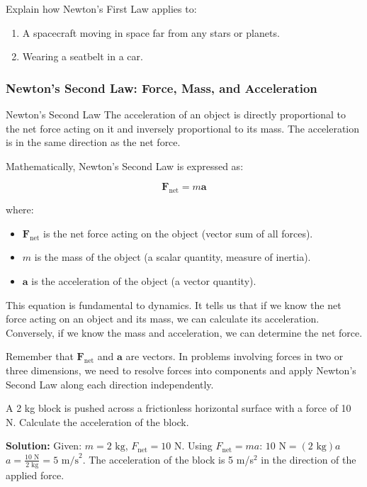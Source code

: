 \begin{stopandthink}
Explain how Newton's First Law applies to:
\begin{enumerate}
    \item A spacecraft moving in space far from any stars or planets.
    \item Wearing a seatbelt in a car.
\end{enumerate}
\end{stopandthink}

\subsubsection{Newton's Second Law: Force, Mass, and Acceleration}

\begin{keyconcept}{Newton's Second Law}
The acceleration of an object is directly proportional to the net force acting on it and inversely proportional to its mass. The acceleration is in the same direction as the net force.
\end{keyconcept}

Mathematically, Newton's Second Law is expressed as:

\[ \mathbf{F}_\text{net} = m\mathbf{a} \]

where:
\begin{itemize}
    \item $\mathbf{F}_\text{net}$ is the net force acting on the object (vector sum of all forces).
    \item $m$ is the mass of the object (a scalar quantity, measure of inertia).
    \item $\mathbf{a}$ is the acceleration of the object (a vector quantity).
\end{itemize}

This equation is fundamental to dynamics. It tells us that if we know the net force acting on an object and its mass, we can calculate its acceleration.  Conversely, if we know the mass and acceleration, we can determine the net force.

\begin{marginnote}
  Remember that $\mathbf{F}_\text{net}$ and $\mathbf{a}$ are vectors.  In problems involving forces in two or three dimensions, we need to resolve forces into components and apply Newton's Second Law along each direction independently.
\end{marginnote}

\begin{example}
A 2 kg block is pushed across a frictionless horizontal surface with a force of 10 N. Calculate the acceleration of the block.

\textbf{Solution:}
Given: $m = 2 \text{ kg}$, $F_\text{net} = 10 \text{ N}$.
Using $F_\text{net} = ma$:
$10 \text{ N} = (2 \text{ kg})a$
$a = \frac{10 \text{ N}}{2 \text{ kg}} = 5 \text{ m/s}^2$.
The acceleration of the block is 5 m/s$^2$ in the direction of the applied force.
\end{example}

